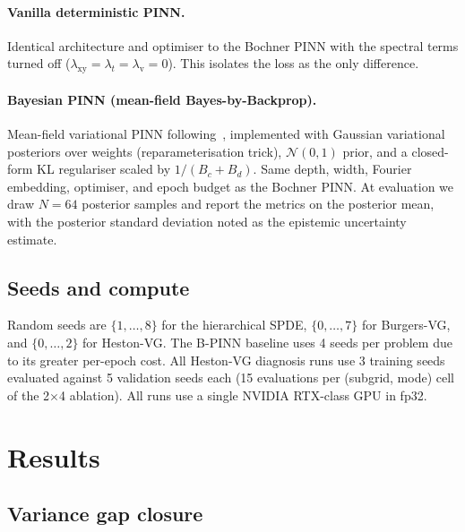 \documentclass[review,12pt]{elsarticle}
\begin{document}
\paragraph{Vanilla deterministic PINN.} Identical architecture and
optimiser to the Bochner PINN with the spectral terms turned off
(\(\lambda_{\mathrm{xy}} = \lambda_t = \lambda_{\mathrm v} = 0\)).
This isolates the loss as the only difference.

\paragraph{Bayesian PINN (mean-field Bayes-by-Backprop).}
Mean-field variational PINN following~\cite{YangMengKarniadakis2021},
implemented with Gaussian variational posteriors over weights
(reparameterisation trick), \(\mathcal N(0, 1)\) prior, and a
closed-form KL regulariser scaled by \(1/(B_c + B_d)\). Same
depth, width, Fourier embedding, optimiser, and epoch budget as
the Bochner PINN. At evaluation we draw \(N = 64\) posterior
samples and report the metrics on the posterior mean, with the
posterior standard deviation noted as the epistemic uncertainty
estimate.

\subsection{Seeds and compute}

Random seeds are \(\{1,\ldots,8\}\) for the hierarchical SPDE,
\(\{0,\ldots,7\}\) for Burgers-VG, and \(\{0,\ldots,2\}\) for
Heston-VG. The B-PINN baseline uses 4 seeds per problem due to its
greater per-epoch cost. All Heston-VG diagnosis runs use 3 training
seeds evaluated against 5 validation seeds each (15 evaluations per
(subgrid, mode) cell of the 2\(\times\)4 ablation). All runs use a
single NVIDIA RTX-class GPU in fp32.

\section{Results}
\label{sec:results}

\subsection{Variance gap closure}
\label{subsec:variance-gap}
\label{subsec:gap}
\end{document}
